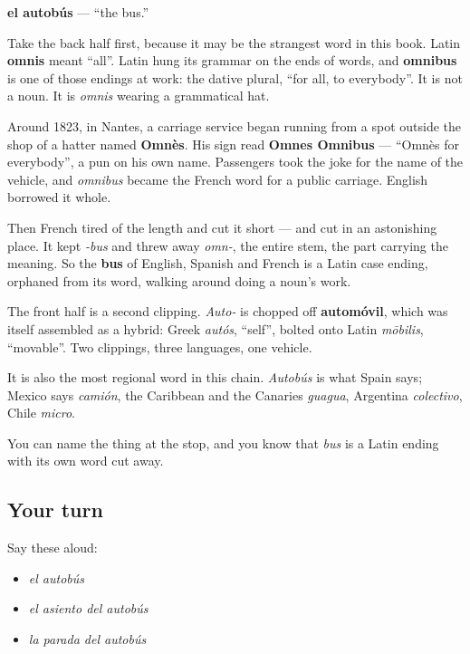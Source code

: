 \begin{cousinweb}
\textbf{el autobús} — \textquotedblleft{}the bus.\textquotedblright{}

Take the back half first, because it may be the strangest word in this book. Latin \textbf{omnis} meant \textquotedblleft{}all\textquotedblright{}. Latin hung its grammar on the ends of words, and \textbf{omnibus} is one of those endings at work: the dative plural, \textquotedblleft{}for all, to everybody\textquotedblright{}. It is not a noun. It is \emph{omnis} wearing a grammatical hat.

Around 1823, in Nantes, a carriage service began running from a spot outside the shop of a hatter named \textbf{Omnès}. His sign read \textbf{Omnes Omnibus} — \textquotedblleft{}Omnès for everybody\textquotedblright{}, a pun on his own name. Passengers took the joke for the name of the vehicle, and \emph{omnibus} became the French word for a public carriage. English borrowed it whole.

Then French tired of the length and cut it short — and cut in an astonishing place. It kept \emph{-bus} and threw away \emph{omn-}, the entire stem, the part carrying the meaning. So the \textbf{bus} of English, Spanish and French is a Latin case ending, orphaned from its word, walking around doing a noun's work.

The front half is a second clipping. \emph{Auto-} is chopped off \textbf{automóvil}, which was itself assembled as a hybrid: Greek \emph{autós}, \textquotedblleft{}self\textquotedblright{}, bolted onto Latin \emph{mōbilis}, \textquotedblleft{}movable\textquotedblright{}. Two clippings, three languages, one vehicle.

It is also the most regional word in this chain. \emph{Autobús} is what Spain says; Mexico says \emph{camión}, the Caribbean and the Canaries \emph{guagua}, Argentina \emph{colectivo}, Chile \emph{micro}.
\end{cousinweb}

\begin{grammarlens}[title={What you've built}]
You can name the thing at the stop, and you know that \emph{bus} is a Latin ending with its own word cut away.
\end{grammarlens}

\subsection*{Your turn}
Say these aloud:

\begin{itemize}
\raggedright
  \item \emph{el autobús}
  \item \emph{el asiento del autobús}
  \item \emph{la parada del autobús}
\end{itemize}

